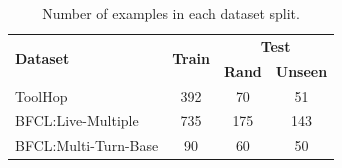 \begin{table}[h]
\small
\caption{Number of examples in each dataset split.}
\vspace{0.5em}
\label{tab:dataset}
\centering
\renewcommand{\arraystretch}{1.25}
\begin{tabular}{@{}l|c|cc@{}}
\toprule
\multirow{2}{*}{\textbf{Dataset}} & 
\multirow{2}{*}{\textbf{Train}} & 
\multicolumn{2}{c}{\textbf{Test}} \\
 &  & \textbf{Rand} & \textbf{Unseen} \\
\midrule
ToolHop & 392 & 70 & 51 \\
BFCL:Live-Multiple & 735 & 175 & 143 \\
BFCL:Multi-Turn-Base & 90 & 60 & 50 \\
\bottomrule
\end{tabular}
\end{table}
